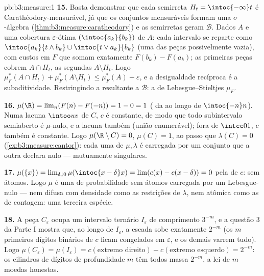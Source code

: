 \begin{solution}{pb:b3:measure:1}
\textbf{15.} Basta demonstrar que cada semirreta $H_t =
\intoc{-\infty}t$ é Carathéodory-mensurável, já que os conjuntos
mensuráveis formam uma $\sigma$-álgebra
(\cref{thm:b3:measure:caratheodory}) e as semirretas geram
$\mathcal B$. Dados $A$ e uma cobertura $\varepsilon$-ótima
$(\intoc{a_k}{b_k})$ de $A$: cada intervalo se reparte como
$\intoc{a_k}{t\wedge b_k} \cup \intoc{t \vee a_k}{b_k}$ (uma das peças
possivelmente vazia), com custos em $F$ que somam exatamente
$F(b_k) - F(a_k)$; as primeiras peças cobrem $A \cap H_t$, as
segundas $A \setminus H_t$. Logo $\mu_F^*(A\cap H_t) +
\mu_F^*(A\setminus H_t) \leq \mu_F^*(A) + \varepsilon$, e
a desigualdade recíproca é a subaditividade. Restringindo a
 resultante a $\mathcal B$: a  de Lebesgue--Stieltjes
$\mu_F$.

\textbf{16.} $\mu(\R) = \lim_n(F(n) - F(-n)) = 1 - 0 = 1$
( da  ao longo de $\intoc{-n}n$). Numa lacuna
$\intoo uv$ de $C$, $c$ é constante, de modo que todo subintervalo
semiaberto é $\mu$-nulo, e a lacuna também (união
enumerável); fora de $\intcc01$, $c$ também é constante. Logo
$\mu(\R\setminus C) = 0$, $\mu(C) = 1$, ao passo que $\lambda(C) =
0$ (\cref{ex:b3:measure:cantor}): cada uma de $\mu, \lambda$ é
carregada por um conjunto que a outra declara nulo --- mutuamente
singulares.

\textbf{17.} $\mu(\{x\}) = \lim_{\delta\downarrow0}
\mu(\intoc{x-\delta}x) = \lim(c(x) - c(x-\delta)) = 0$ pela
 de $c$: sem átomos. Logo $\mu$ é uma  de
probabilidade sem átomos carregada por um  Lebesgue-nulo ---
nem difusa com densidade como as restrições de $\lambda$,
nem atômica como as  de contagem: uma terceira espécie.

\textbf{18.} A peça $C_\varepsilon$ ocupa um intervalo
ternário $I_\varepsilon$ de comprimento $3^{-m}$, e a questão 3
da Parte I mostra que, ao longo de $I_\varepsilon$, a escada
sobe exatamente $2^{-m}$ (os $m$ primeiros dígitos binários de $c$
ficam congelados em $\varepsilon$, e os demais varrem tudo).
Logo $\mu(C_\varepsilon) = \mu(I_\varepsilon) =
c(\text{extremo direito}) - c(\text{extremo esquerdo}) = 2^{-m}$: os cilindros de dígitos de
profundidade $m$ têm todos massa $2^{-m}$, a lei de $m$ moedas
honestas.


\end{solution}
